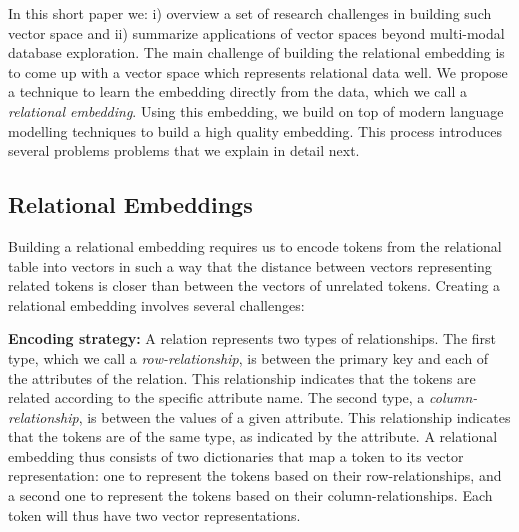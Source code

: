 In this short paper we: i) overview a set of research challenges in building
such vector space and ii) summarize applications of vector spaces beyond
multi-modal database exploration. The main challenge of building the relational
embedding is to come up with a vector space which represents relational data
well. 
We propose a technique to learn the embedding directly from the data, which we
call a \emph{relational embedding}. Using this embedding, we build on top of
modern language modelling techniques to build a high quality embedding. This
process introduces several problems problems that we explain in detail next.

\subsection*{Relational Embeddings}

Building a relational embedding requires us to encode tokens from the
relational table into vectors in such a way that the distance between vectors
representing related tokens is closer than between the vectors of unrelated
tokens. Creating a relational embedding involves several challenges:

\noindent\textbf{Encoding strategy: } A relation represents two types of
relationships.  The first type, which we call a \emph{row-relationship}, is
between the primary key and each of the attributes of the relation. This
relationship indicates that the tokens are related according to the specific
attribute name. The second type, a \emph{column-relationship}, is between the
values of a given attribute. This relationship indicates that the tokens are of
the same type, as indicated by the attribute. A relational embedding thus
consists of two dictionaries that map a token to its vector
representation:
one to represent the tokens based on their row-relationships, and a second one
to represent the tokens based on their column-relationships. Each token will
thus have two vector representations. 

